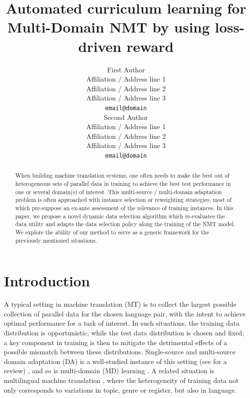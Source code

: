 \documentclass[11pt,a4paper]{article}
\title{Automated curriculum learning for Multi-Domain NMT by using loss-driven reward}
\author{First Author \\
  Affiliation / Address line 1 \\
  Affiliation / Address line 2 \\
  Affiliation / Address line 3 \\
  \texttt{email@domain} \\\And
  Second Author \\
  Affiliation / Address line 1 \\
  Affiliation / Address line 2 \\
  Affiliation / Address line 3 \\
  \texttt{email@domain} \\}
\date{}
\newcommand{\fyTodo}[1]{\Todo[FY:]{\textcolor{orange}{#1}}}
\begin{document}
\maketitle
\setlength{\abovedisplayskip}{2pt}
\setlength{\belowdisplayskip}{2pt}
\begin{abstract}
  When building machine translation systems, one often needs to make the best out of heterogeneous sets of parallel data in training to achieve the best test performance in one or several domain(s) of interest. This multi-source / multi-domain adaptation problem is often approached with instance selection or reweighting strategies, most of which pre-suppose an ex-ante assessment of the relevance of training instances. In this paper, we propose a novel dynamic data selection algorithm which re-evaluates the data utility and adapts the data selection policy along the training of the NMT model. We explore the ability of our method to serve as a generic framework for the previously mentioned situations.
\end{abstract}

\section{Introduction}\label{sec:intro}
A typical setting in machine translation (MT) is to collect the largest possible collection of parallel data for the chosen language pair, with the intent to achieve optimal performance for a task of interest. In such situations, the training data distribution is opportunistic, while the test data distribution is chosen and fixed; a key component in training is then to mitigate the detrimental effects of a possible mismatch between these distributions. Single-source and multi-source domain adaptation (DA) is a well-studied instance of this setting (see \citep{Chu2017comparison} for a review) , and so is multi-domain (MD) learning \cite{Chu18multilingual,Zeng18multidomain,Jiang19multidomain,Pham21revisiting}. A related situation is multilingual machine translation \cite{Firat16multiway,Ha16towards,Johnson17google,Arivazhagan19massively}\fyTodo{Add more recent work}, where the heterogeneity of training data not only corresponds to variations in topic, genre or register, but also in language.
\end{document}
